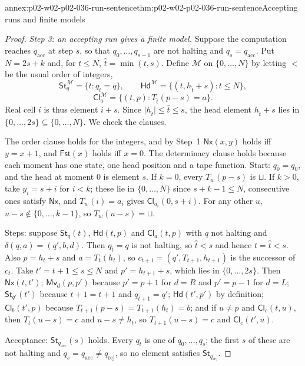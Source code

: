 \begin{annexitem}{annex:p02-w02-p02-036-run-sentence}{thm:p02-w02-p02-036-run-sentence}{Accepting runs and finite models}
\begin{proof}
\emph{Step 3: an accepting run gives a finite model.}  Suppose the
computation reaches \(q_{\mathrm{acc}}\) at step \(s\), so that
\(q_0,\ldots,q_{s-1}\) are not halting and \(q_s=q_{\mathrm{acc}}\).  Put
\(N=2s+k\) and, for \(t\leq N\), \(\hat t=\min(t,s)\).  Define \(\mathcal M\) on
\(\{0,\ldots,N\}\) by letting \(<\) be the usual order of integers,
\[
 \mathsf{St}_q^{\mathcal M}=\{t:q_{\hat t}=q\},\qquad
 \mathsf{Hd}^{\mathcal M}=\{(t,h_{\hat t}+s):t\leq N\},
\]
\[
 \mathsf{Cl}_a^{\mathcal M}=\{(t,p):T_{\hat t}(p-s)=a\}.
\]
Real cell \(i\) is thus element \(i+s\).  Since
\(\lvert h_{\hat t}\rvert\leq\hat t\leq s\), the head element \(h_{\hat t}+s\)
lies in \(\{0,\ldots,2s\}\subseteq\{0,\ldots,N\}\).  We check the clauses.

The order clause holds for the integers, and by Step~1
\(\mathsf{Nx}(x,y)\) holds iff \(y=x+1\), and \(\mathsf{Fst}(x)\) holds iff
\(x=0\).  The determinacy clause holds because each moment has one state, one
head position and a tape function.  Start: \(q_{\hat 0}=q_0\), and the head at
moment \(0\) is element \(s\).  If \(k=0\), every \(T_w(p-s)\) is \(\sqcup\).
If \(k>0\), take \(y_i=s+i\) for \(i<k\); these lie in \(\{0,\ldots,N\}\) since
\(s+k-1\leq N\), consecutive ones satisfy \(\mathsf{Nx}\), and
\(T_w(i)=a_i\) gives \(\mathsf{Cl}_{a_i}(0,s+i)\).  For any other \(u\),
\(u-s\notin\{0,\ldots,k-1\}\), so \(T_w(u-s)=\sqcup\).

Steps: suppose \(\mathsf{St}_q(t)\), \(\mathsf{Hd}(t,p)\) and
\(\mathsf{Cl}_a(t,p)\) with \(q\) not halting and \(\delta(q,a)=(q',b,d)\).
Then \(q_{\hat t}=q\) is not halting, so \(\hat t<s\) and hence \(t=\hat t<s\).
Also \(p=h_t+s\) and \(a=T_t(h_t)\), so \(c_{t+1}=(q',T_{t+1},h_{t+1})\) is the
successor of \(c_t\).  Take \(t'=t+1\leq s\leq N\) and \(p'=h_{t+1}+s\), which
lies in \(\{0,\ldots,2s\}\).  Then \(\mathsf{Nx}(t,t')\); \(\mathsf{Mv}_d(p,p')\)
because \(p'=p+1\) for \(d=R\) and \(p'=p-1\) for \(d=L\);
\(\mathsf{St}_{q'}(t')\) because \(\widehat{t+1}=t+1\) and \(q_{t+1}=q'\);
\(\mathsf{Hd}(t',p')\) by definition; \(\mathsf{Cl}_b(t',p)\) because
\(T_{t+1}(p-s)=T_{t+1}(h_t)=b\); and if \(u\neq p\) and \(\mathsf{Cl}_c(t,u)\),
then \(T_t(u-s)=c\) and \(u-s\neq h_t\), so \(T_{t+1}(u-s)=c\) and
\(\mathsf{Cl}_c(t',u)\).

Acceptance: \(\mathsf{St}_{q_{\mathrm{acc}}}(s)\) holds.  Every
\(q_{\hat t}\) is one of \(q_0,\ldots,q_s\); the first \(s\) of these are not
halting and \(q_s=q_{\mathrm{acc}}\neq q_{\mathrm{rej}}\), so no element
satisfies \(\mathsf{St}_{q_{\mathrm{rej}}}\).


\end{proof}
\end{annexitem}
